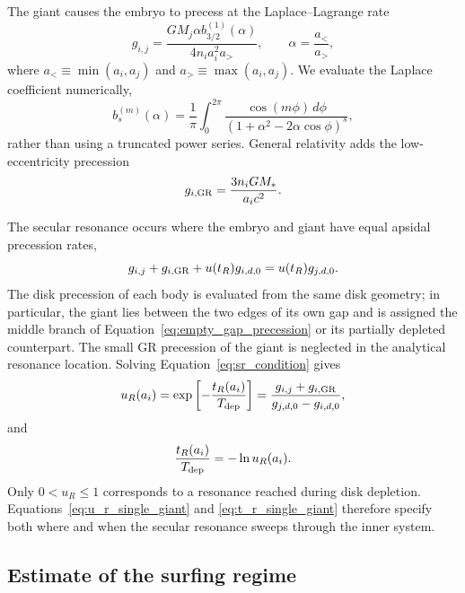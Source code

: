 The giant causes the embryo to precess at the Laplace--Lagrange rate
\begin{equation}
    g_{i,j}=\frac{G M_j\alpha b_{3/2}^{(1)}(\alpha)}
    {4n_i a_i^2a_>},
    \qquad
    \alpha=\frac{a_<}{a_>},
\label{eq:gij_analytical}
\end{equation}
where $a_<\equiv\min(a_i,a_j)$ and $a_>\equiv\max(a_i,a_j)$. We evaluate the
Laplace coefficient numerically,
\begin{equation}
    b_s^{(m)}(\alpha)=\frac{1}{\pi}
    \int_0^{2\pi}
    \frac{\cos(m\phi)\,d\phi}
    {(1+\alpha^2-2\alpha\cos\phi)^s},
\label{eq:laplace_integral}
\end{equation}
rather than using a truncated power series. General relativity adds the
low-eccentricity precession
\begin{equation}
    g_{i,\rm GR}=\frac{3n_iGM_*}{a_i c^2}.
\label{eq:gr_precession}
\end{equation}

The secular resonance occurs where the embryo and giant have equal
apsidal precession rates,
\begin{equation}
    g_{i,j}+g_{i,\rm GR}+u(t_R)g_{i,d,0}
    =u(t_R)g_{j,d,0}.
\label{eq:sr_condition}
\end{equation}
The disk precession of each body is evaluated from the same disk geometry;
in particular, the giant lies between the two edges of its own gap and is
assigned the middle branch of Equation~\ref{eq:empty_gap_precession} or
its partially depleted counterpart. The small GR precession of the giant
is neglected in the analytical resonance location. Solving
Equation~\ref{eq:sr_condition} gives
\begin{equation}
    u_R(a_i)=\exp\left[-\frac{t_R(a_i)}{T_{\rm dep}}\right]
    =\frac{g_{i,j}+g_{i,\rm GR}}
    {g_{j,d,0}-g_{i,d,0}},
\label{eq:u_r_single_giant}
\end{equation}
and
\begin{equation}
    \frac{t_R(a_i)}{T_{\rm dep}}=-\ln u_R(a_i).
\label{eq:t_r_single_giant}
\end{equation}
Only $0<u_R\leq1$ corresponds to a resonance reached during disk
depletion. Equations~\ref{eq:u_r_single_giant} and
\ref{eq:t_r_single_giant} therefore specify both where and when the
secular resonance sweeps through the inner system.

\subsection{Estimate of the surfing regime}

